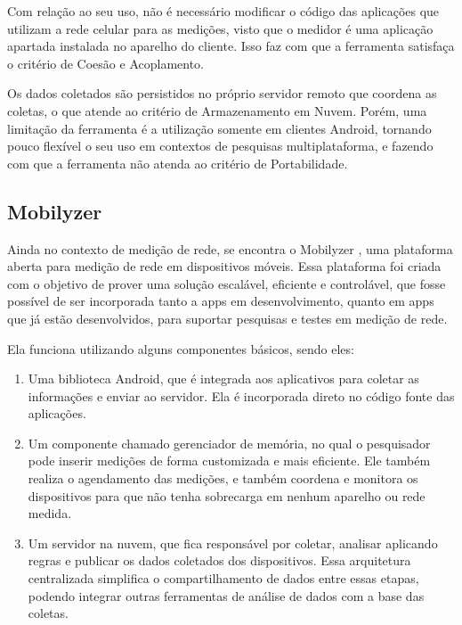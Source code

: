 \documentclass[12pt]{tcc}
\begin{document}
	Com relação ao seu uso, não é necessário modificar o código das aplicações que utilizam a rede celular para as medições, visto que o medidor é uma aplicação apartada instalada no aparelho do cliente. Isso faz com que a ferramenta satisfaça o critério de Coesão e Acoplamento. 

	Os dados coletados são persistidos no próprio servidor remoto que coordena as coletas, o que atende ao critério de Armazenamento em Nuvem. Porém, uma limitação da ferramenta é a utilização somente em clientes Android, tornando pouco flexível o seu uso em contextos de pesquisas multiplataforma, e fazendo com que a ferramenta não atenda ao critério de Portabilidade.

	\subsection{Mobilyzer}
	\par Ainda no contexto de medição de rede, se encontra o Mobilyzer \citep{Nikravesh2015Mobilyzer}, uma plataforma aberta para medição de rede em dispositivos móveis. Essa plataforma foi criada com o objetivo de prover uma solução escalável, eficiente e controlável, que fosse possível de ser incorporada tanto a apps em desenvolvimento, quanto em apps que já estão desenvolvidos, para suportar pesquisas e testes em medição de rede. 
	\par Ela funciona utilizando alguns componentes básicos, sendo eles: 
	\begin{enumerate}
		\item Uma biblioteca Android, que é integrada aos aplicativos para coletar as informações e enviar ao servidor. Ela é incorporada direto no código fonte das aplicações.
		\item Um componente chamado gerenciador de memória, no qual o pesquisador pode inserir medições de forma customizada e mais eficiente. Ele também realiza o agendamento das medições, e também coordena e monitora os dispositivos para que não tenha sobrecarga em nenhum aparelho ou rede medida. 
		\item Um servidor na nuvem, que fica responsável por coletar, analisar aplicando regras e publicar os dados coletados dos dispositivos. Essa arquitetura centralizada simplifica o compartilhamento de dados entre essas etapas, podendo integrar outras ferramentas de análise de dados com a base das coletas.

	\end{enumerate}
\end{document}
